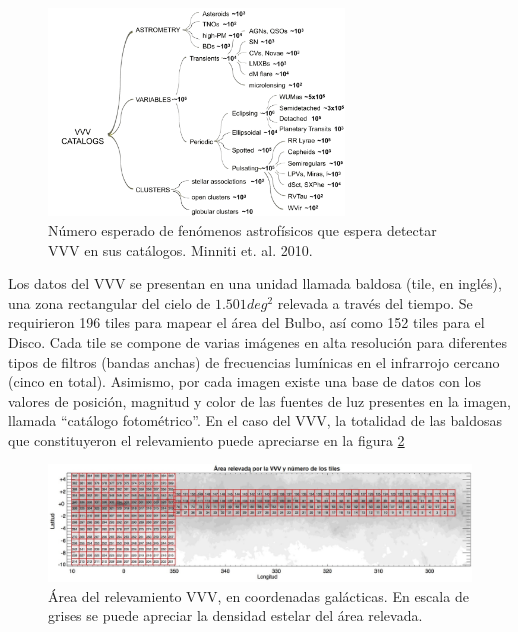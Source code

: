 \begin{figure}[h]
\begin{center}
\includegraphics[width=0.7\textwidth]{Kap1/vvv_objects.png}
\end{center}
\caption[short]{Número esperado de fenómenos astrofísicos que espera detectar VVV en sus catálogos. Minniti et. al. 2010.}
\label{fig:vvv_objects}
\end{figure}

\par Los datos del VVV se presentan en una unidad llamada baldosa (tile, en inglés), una zona rectangular del cielo de $1.501 deg^2$ relevada a través del tiempo. Se requirieron 196 tiles para mapear el área del Bulbo, así como 152 tiles para el Disco. Cada tile se compone de varias imágenes en alta resolución para diferentes tipos de filtros (bandas anchas) de frecuencias lumínicas en el infrarrojo cercano (cinco en total). Asimismo, por cada imagen existe una base de datos con los valores de posición, magnitud y color de las fuentes de luz presentes en la imagen, llamada “catálogo fotométrico”. En el caso del VVV, la totalidad de las baldosas que constituyeron el relevamiento puede apreciarse en la figura \ref{fig:vvv_tiles} \\

\begin{figure}[h]
\begin{center}
\includegraphics[width=\textwidth]{Kap1/vvv_tiles.jpg}
\end{center}
\caption[short]{Área del relevamiento VVV, en coordenadas galácticas. En escala de grises se puede apreciar la densidad estelar del área relevada. ~\protect\cite{Skrutskie_2006}}
\label{fig:vvv_tiles}
\end{figure}

